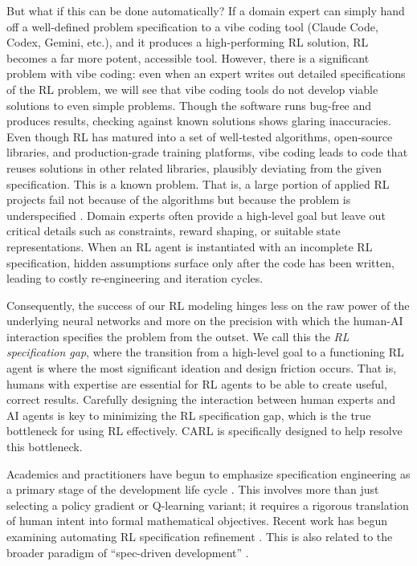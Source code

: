 \documentclass[mnsc,sglanonrev]{informs4}
\begin{document}
But what if this can be done automatically? If a domain expert can simply hand off a well-defined problem specification to a vibe coding tool (Claude Code, Codex, Gemini, etc.), and it produces a high-performing RL solution, RL becomes a far more potent, accessible tool. However, there is a significant problem with vibe coding: even when an expert writes out detailed specifications of the RL problem, we will see that vibe coding tools do not develop viable solutions to even simple problems. Though the software runs bug-free and produces results, checking against known solutions shows glaring inaccuracies. Even though RL has matured into a set of well‑tested algorithms, open‑source libraries, and production‑grade training platforms, vibe coding leads to code that reuses solutions in other related libraries, plausibly deviating from the given specification. This is a known problem. That is, a large portion of applied RL projects fail not because of the algorithms but because the problem is underspecified \citep{jayawardana_impact_2022, hamadanian_how_2022}.  Domain experts often provide a high‑level goal but leave out critical details such as constraints, reward shaping, or suitable state representations.  When an RL agent is instantiated with an incomplete RL specification, hidden assumptions surface only after the code has been written, leading to costly re‑engineering and iteration cycles. 

Consequently, the success of our RL modeling hinges less on the raw power of the underlying neural networks and more on the precision with which the human-AI interaction specifies the problem from the outset. We call this the {\it RL specification gap}, where the transition from a high-level goal to a functioning RL agent is where the most significant ideation and design friction occurs. That is, humans with expertise are essential for RL agents to be able to create useful, correct results. Carefully designing the interaction between human experts and AI agents is key to minimizing the RL specification gap, which is the true bottleneck for using RL effectively. CARL is specifically designed to help resolve this bottleneck.

Academics and practitioners have begun to emphasize specification engineering as a primary stage of the development life cycle \citep{li_formal_2019, ibrahim_comprehensive_2024}. This involves more than just selecting a policy gradient or Q-learning variant; it requires a rigorous translation of human intent into formal mathematical objectives. Recent work has begun examining automating RL specification refinement \citep{ambadkar_automating_2026}. This is also related to the broader paradigm of ``spec-driven development'' \citep{alur_specification-guided_2026, huang_reinforcement_2026}.  
\end{document}

